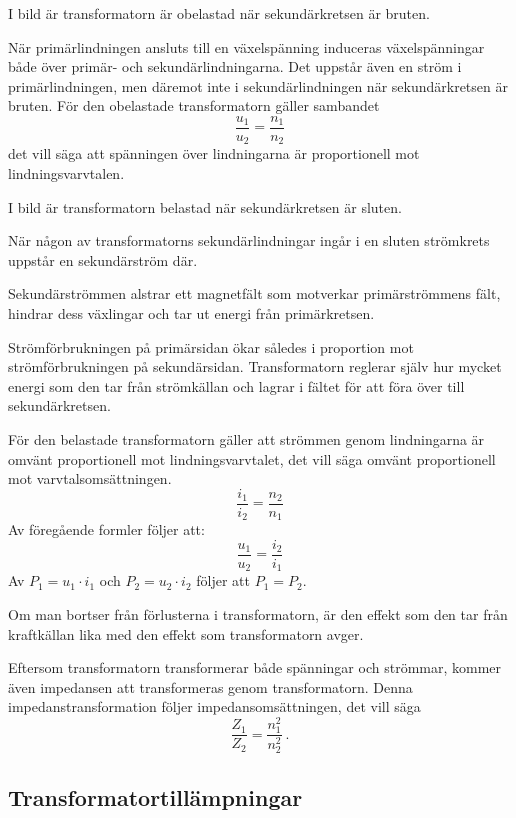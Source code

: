 
I bild  är transformatorn är obelastad när sekundärkretsen
är bruten.

När primärlindningen ansluts till en växelspänning induceras växelspänningar 
både över primär- och sekundärlindningarna. Det uppstår även en ström i 
primärlindningen, men däremot inte i sekundärlindningen när
sekundärkretsen är bruten. För den obelastade transformatorn gäller sambandet
\[\dfrac{u_1}{u_2} = \dfrac{n_1}{n_2}\]
det vill säga att spänningen över lindningarna är proportionell mot lindningsvarvtalen.


I bild  är transformatorn belastad när sekundärkretsen
är sluten.

När någon av transformatorns sekundärlindningar ingår i en sluten strömkrets 
uppstår en sekundärström där.

Sekundärströmmen alstrar ett magnetfält som motverkar primärströmmens fält,
hindrar dess växlingar och tar ut energi från primärkretsen.

Strömförbrukningen på primärsidan ökar således i proportion mot
strömförbrukningen på sekundärsidan. Transformatorn reglerar själv hur mycket
energi som den tar från strömkällan och lagrar i fältet för att föra över
till sekundärkretsen.

För den belastade transformatorn gäller att strömmen genom lindningarna är
omvänt proportionell mot lindningsvarvtalet, det vill säga omvänt proportionell 
mot varvtalsomsättningen.
\[\dfrac{i_1}{i_2} = \dfrac{n_2}{n_1}\]
Av föregående formler följer att:
\[\dfrac{u_1}{u_2} = \dfrac{i_2}{i_1}\]
Av \(P_1 = u_1 \cdot i_1\) och \(P_2 = u_2 \cdot i_2\) följer att \(P_1 = P_2\).

Om man bortser från förlusterna i transformatorn, är den effekt som den tar
från kraftkällan lika med den effekt som transformatorn avger.

Eftersom transformatorn transformerar både spänningar och strömmar, kommer
även impedansen att transformeras genom transformatorn.
Denna impedanstransformation följer impedansomsättningen, det vill säga
\[\dfrac{Z_1}{Z_2} = \dfrac{n_1^2}{n_2^2}~.\]

\subsection{Transformatortillämpningar}

